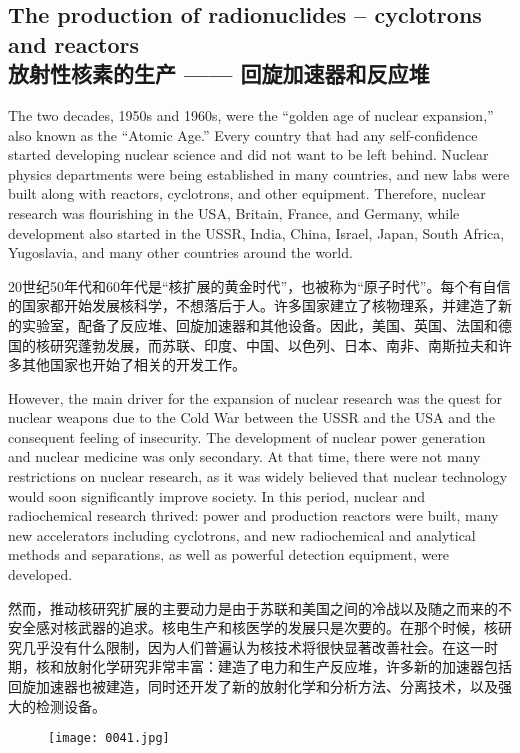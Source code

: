 \documentclass[dvipsnames, svgnames,a4paper,11pt]{article}
\begin{document}
\subsection{The production of radionuclides – cyclotrons and reactors\\放射性核素的生产 —— 回旋加速器和反应堆}

The two decades, 1950s and 1960s, were the “golden age of nuclear expansion,” also known as the “Atomic Age.” Every country that had any self-confidence started developing nuclear science and did not want to be left behind. Nuclear physics departments were being established in many countries, and new labs were built along with reactors, cyclotrons, and other equipment. Therefore, nuclear research was flourishing in the USA, Britain, France, and Germany, while development also started in the USSR, India, China, Israel, Japan, South Africa, Yugoslavia, and many other countries around the world.

20世纪50年代和60年代是“核扩展的黄金时代”，也被称为“原子时代”。每个有自信的国家都开始发展核科学，不想落后于人。许多国家建立了核物理系，并建造了新的实验室，配备了反应堆、回旋加速器和其他设备。因此，美国、英国、法国和德国的核研究蓬勃发展，而苏联、印度、中国、以色列、日本、南非、南斯拉夫和许多其他国家也开始了相关的开发工作。

However, the main driver for the expansion of nuclear research was the quest for nuclear weapons due to the Cold War between the USSR and the USA and the consequent feeling of insecurity. The development of nuclear power generation and nuclear medicine was only secondary. At that time, there were not many restrictions on nuclear research, as it was widely believed that nuclear technology would soon significantly improve society. In this period, nuclear and radiochemical research thrived: power and production reactors were built, many new accelerators including cyclotrons, and new radiochemical and analytical methods and separations, as well as powerful detection equipment, were developed.

然而，推动核研究扩展的主要动力是由于苏联和美国之间的冷战以及随之而来的不安全感对核武器的追求。核电生产和核医学的发展只是次要的。在那个时候，核研究几乎没有什么限制，因为人们普遍认为核技术将很快显著改善社会。在这一时期，核和放射化学研究非常丰富：建造了电力和生产反应堆，许多新的加速器包括回旋加速器也被建造，同时还开发了新的放射化学和分析方法、分离技术，以及强大的检测设备。

\begin{figure}[ht]
      \centering
      \texttt{[image: 0041.jpg]}
       \label{fig32}
\end{figure}
\end{document}
